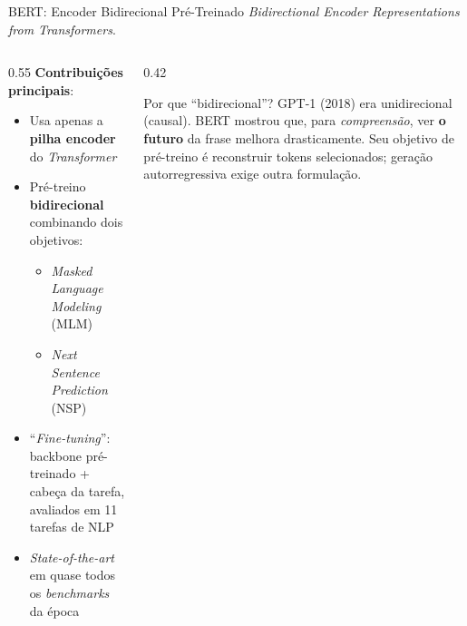 \documentclass[aspectratio=169, xcolor=dvipsnames]{beamer}
\begin{document}
  \begin{frame}{BERT: Encoder Bidirecional Pré-Treinado}
    \small \textit{Bidirectional Encoder Representations from Transformers}.\par\medskip
    
    \begin{columns}
      \begin{column}{0.55\textwidth}
        \textbf{Contribuições principais}:
        \begin{itemize}
          \item Usa apenas a \textbf{pilha encoder} do \textit{Transformer}
          \item Pré-treino \textbf{bidirecional} combinando dois objetivos:
            \begin{itemize}
              \item \textit{Masked Language Modeling} (MLM)
              \item \textit{Next Sentence Prediction} (NSP)
            \end{itemize}
          \item ``\textit{Fine-tuning}'': backbone pré-treinado + cabeça da tarefa, avaliados em 11 tarefas de NLP
          \item \textit{State-of-the-art} em quase todos os \textit{benchmarks} da época
        \end{itemize}
      \end{column}
      \begin{column}{0.42\textwidth}
        \begin{exampleblock}{Por que ``bidirecional''?}
          GPT-1 (2018) era unidirecional (causal). BERT mostrou que, para \textit{compreensão}, ver \textbf{o futuro} da frase melhora drasticamente.
          \vspace{0.3em}
          Seu objetivo de pré-treino é reconstruir tokens selecionados; geração autorregressiva exige outra formulação.
        \end{exampleblock}
      \end{column}
    \end{columns}
  \end{frame}
\end{document}
